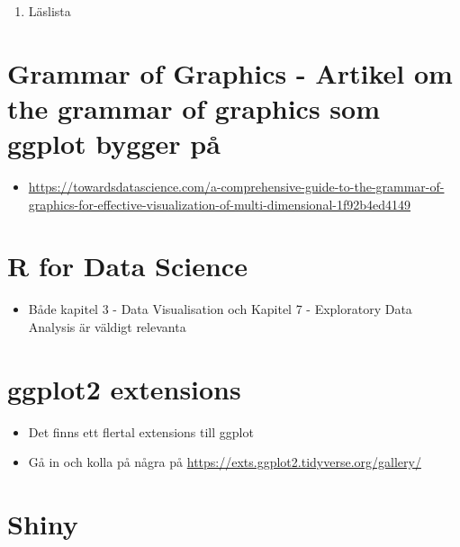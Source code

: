 \documentclass[
]{book}
\providecommand{\tightlist}{%
  \setlength{\itemsep}{0pt}\setlength{\parskip}{0pt}}
\begin{document}
\begin{enumerate}
\def\labelenumi{\arabic{enumi}.}
\setcounter{enumi}{3}
\tightlist
\item
  Läslista
\end{enumerate}

\hypertarget{grammar-of-graphics---artikel-om-the-grammar-of-graphics-som-ggplot-bygger-puxe5}{%
\section{Grammar of Graphics - Artikel om the grammar of graphics som ggplot bygger på}\label{grammar-of-graphics---artikel-om-the-grammar-of-graphics-som-ggplot-bygger-puxe5}}

\begin{itemize}
\tightlist
\item
  \url{https://towardsdatascience.com/a-comprehensive-guide-to-the-grammar-of-graphics-for-effective-visualization-of-multi-dimensional-1f92b4ed4149}
\end{itemize}

\hypertarget{r-for-data-science}{%
\section{R for Data Science}\label{r-for-data-science}}

\begin{itemize}
\tightlist
\item
  Både kapitel 3 - Data Visualisation och Kapitel 7 - Exploratory Data Analysis är väldigt relevanta
\end{itemize}

\hypertarget{ggplot2-extensions}{%
\section{ggplot2 extensions}\label{ggplot2-extensions}}

\begin{itemize}
\tightlist
\item
  Det finns ett flertal extensions till ggplot
\item
  Gå in och kolla på några på \url{https://exts.ggplot2.tidyverse.org/gallery/}
\end{itemize}

\hypertarget{shiny}{%
\section{Shiny}\label{shiny}}
\end{document}
